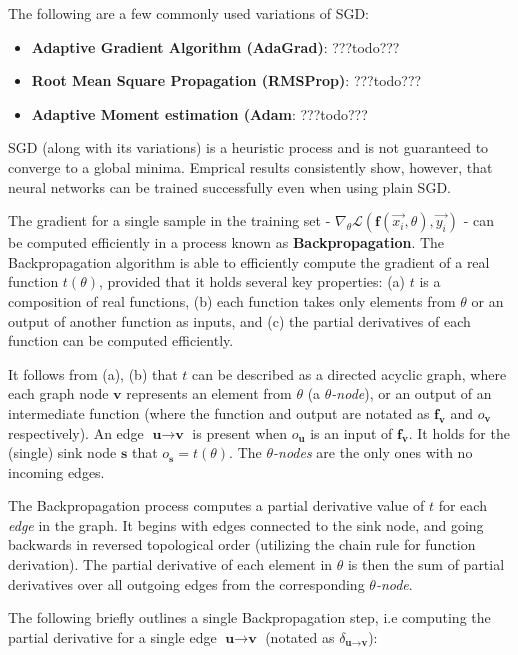 The following are a few commonly used variations of SGD:
\begin{itemize}
    \item \textbf{Adaptive Gradient Algorithm (AdaGrad)}: ???todo???
    \item \textbf{Root Mean Square Propagation (RMSProp)}: ???todo???
    \item \textbf{Adaptive Moment estimation (Adam}: ???todo???    
\end{itemize}

SGD (along with its variations) is a heuristic process and is not guaranteed to converge to a global minima. Emprical results consistently show, however, that neural networks can be trained successfully even when using plain SGD.

The gradient for a single sample in the training set -  $\nabla_\theta \mathcal{L}(\textbf{f}(\vec{x_i}, \theta), \vec{y_i})$ - can be computed efficiently in a process known as \textbf{Backpropagation}. The Backpropagation
algorithm is able to efficiently compute the gradient of a real function $t(\theta)$, provided that it holds several key properties: (a) $t$ is a composition of real functions, (b) each function takes only elements from $\theta$ or an output of another function as inputs, and (c) the partial derivatives of each function can be computed efficiently.  

It follows from (a), (b) that $t$ can be described as a directed acyclic graph, where each graph node $\textbf{v}$ represents an element from $\theta$ (a \textit{$\theta$-node}), or an output of an intermediate function (where the function and output are notated as $\textbf{f}_{\textbf{v}}$ and $o_{\textbf{v}}$ respectively). An edge $\textbf{u}\rightarrow\textbf{v}$ is present when $o_{\textbf{u}}$ is an input of $\textbf{f}_\textbf{v}$. It holds for the (single) sink node $\textbf{s}$ that $o_{\textbf{s}} = t(\theta)$. The \textit{$\theta$-nodes} are the only ones with no incoming edges. 

The Backpropagation process computes a partial derivative value of $t$ for each \emph{edge} in the graph. It begins with edges connected to the sink node, and going backwards in reversed topological order (utilizing the chain rule for function derivation). The partial derivative of each element in $\theta$ is then the sum of partial derivatives over all outgoing edges from the corresponding \textit{$\theta$-node}.

The following briefly outlines a single Backpropagation step, i.e computing the partial derivative for a single edge $\textbf{u}\rightarrow\textbf{v}$ (notated as $\delta_{\textbf{u}\rightarrow\textbf{v}}$):   

